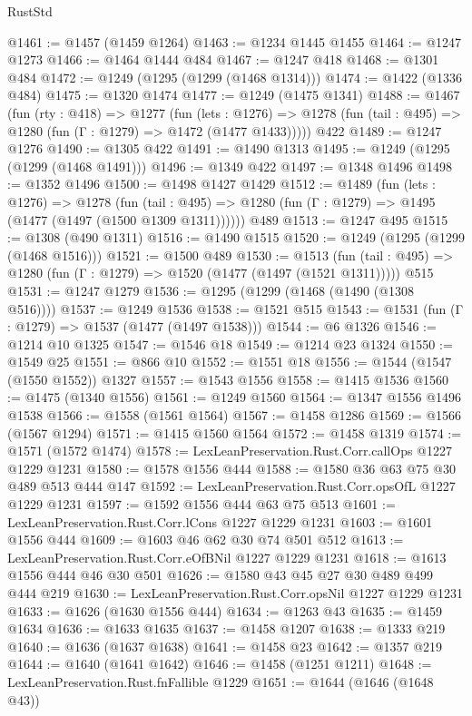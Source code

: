 \begin{lexlean}{RustStd}
\begin{coremodule}
{\begin{coremodule}
{{{{{{{{{{{@1461 := @1457 (@1459 @1264)
@1463 := @1234 @1445 @1455
@1464 := @1247 @1273
@1466 := @1464 @1444 @484
@1467 := @1247 @418
@1468 := @1301 @484
@1472 := @1249 (@1295 (@1299 (@1468 @1314)))
@1474 := @1422 (@1336 @484)
@1475 := @1320 @1474
@1477 := @1249 (@1475 @1341)
@1488 := @1467
    (fun (rty : @418) =>
    @1277
      (fun (lets : @1276) =>
      @1278 (fun (tail : @495) => @1280 (fun (Γ : @1279) => @1472 (@1477 @1433)))))
    @422
@1489 := @1247 @1276
@1490 := @1305 @422
@1491 := @1490 @1313
@1495 := @1249 (@1295 (@1299 (@1468 @1491)))
@1496 := @1349 @422
@1497 := @1348 @1496
@1498 := @1352 @1496
@1500 := @1498 @1427 @1429
@1512 := @1489
    (fun (lets : @1276) =>
    @1278
      (fun (tail : @495) => @1280 (fun (Γ : @1279) => @1495 (@1477 (@1497 (@1500 @1309 @1311))))))
    @489
@1513 := @1247 @495
@1515 := @1308 (@490 @1311)
@1516 := @1490 @1515
@1520 := @1249 (@1295 (@1299 (@1468 @1516)))
@1521 := @1500 @489
@1530 := @1513
    (fun (tail : @495) => @1280 (fun (Γ : @1279) => @1520 (@1477 (@1497 (@1521 @1311)))))
    @515
@1531 := @1247 @1279
@1536 := @1295 (@1299 (@1468 (@1490 (@1308 @516))))
@1537 := @1249 @1536
@1538 := @1521 @515
@1543 := @1531 (fun (Γ : @1279) => @1537 (@1477 (@1497 @1538)))
@1544 := @6 @1326
@1546 := @1214 @10 @1325
@1547 := @1546 @18
@1549 := @1214 @23 @1324
@1550 := @1549 @25
@1551 := @866 @10
@1552 := @1551 @18
@1556 := @1544 (@1547 (@1550 @1552)) @1327
@1557 := @1543 @1556
@1558 := @1415 @1536
@1560 := @1475 (@1340 @1556)
@1561 := @1249 @1560
@1564 := @1347 @1556 @1496 @1538
@1566 := @1558 (@1561 @1564)
@1567 := @1458 @1286
@1569 := @1566 (@1567 @1294)
@1571 := @1415 @1560 @1564
@1572 := @1458 @1319
@1574 := @1571 (@1572 @1474)
@1578 := LexLeanPreservation.Rust.Corr.callOps @1227 @1229 @1231
@1580 := @1578 @1556 @444
@1588 := @1580 @36 @63 @75 @30 @489 @513 @444 @147
@1592 := LexLeanPreservation.Rust.Corr.opsOfL @1227 @1229 @1231
@1597 := @1592 @1556 @444 @63 @75 @513
@1601 := LexLeanPreservation.Rust.Corr.lCons @1227 @1229 @1231
@1603 := @1601 @1556 @444
@1609 := @1603 @46 @62 @30 @74 @501 @512
@1613 := LexLeanPreservation.Rust.Corr.eOfBNil @1227 @1229 @1231
@1618 := @1613 @1556 @444 @46 @30 @501
@1626 := @1580 @43 @45 @27 @30 @489 @499 @444 @219
@1630 := LexLeanPreservation.Rust.Corr.opsNil @1227 @1229 @1231
@1633 := @1626 (@1630 @1556 @444)
@1634 := @1263 @43
@1635 := @1459 @1634
@1636 := @1633 @1635
@1637 := @1458 @1207
@1638 := @1333 @219
@1640 := @1636 (@1637 @1638)
@1641 := @1458 @23
@1642 := @1357 @219
@1644 := @1640 (@1641 @1642)
@1646 := @1458 (@1251 @1211)
@1648 := LexLeanPreservation.Rust.fnFallible @1229
@1651 := @1644 (@1646 (@1648 @43))
}}}}}}}}}}}
\end{coremodule}}
\end{coremodule}
\end{lexlean}
